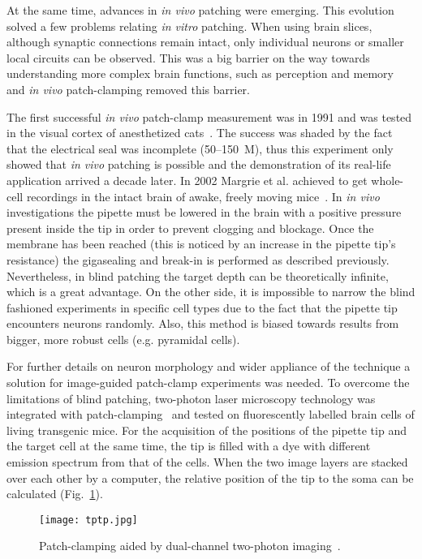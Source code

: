 \documentclass[12pt,a4paper]{report}
\begin{document}
At the same time, advances in \textit{in vivo} patching were emerging. This evolution solved a few problems relating \textit{in vitro} patching. When using brain slices, although synaptic connections remain intact, only individual neurons or smaller local circuits can be observed. This was a big barrier on the way towards understanding more complex brain functions, such as perception and memory and \textit{in vivo} patch-clamping removed this barrier.\par
The first successful \textit{in vivo} patch-clamp measurement was in 1991 and was tested in the visual cortex of anesthetized cats~\cite{pel1991}. The success was shaded by the fact that the electrical seal was incomplete (50--150~M\textOmega), thus this experiment only showed that \textit{in vivo} patching is possible and the demonstration of its real-life application arrived a decade later. In 2002 Margrie et al. achieved to get whole-cell recordings in the intact brain of awake, freely moving mice~\cite{margrie2002}. In \textit{in vivo} investigations the pipette must be lowered in the brain with a positive pressure present inside the tip in order to prevent clogging and blockage. Once the membrane has been reached (this is noticed by an increase in the pipette tip's resistance) the gigasealing and break-in is performed as described previously. Nevertheless, in blind patching the target depth can be theoretically infinite, which is a great advantage. On the other side, it is impossible to narrow the blind fashioned experiments in specific cell types due to the fact that the pipette tip encounters neurons randomly. Also, this method is biased towards results from bigger, more robust cells (e.g. pyramidal cells).\par
For further details on neuron morphology and wider appliance of the technique a solution for image-guided patch-clamp experiments was needed. To overcome the limitations of blind patching, two-photon laser microscopy technology was integrated with patch-clamping~\cite{margrie2003} and tested on fluorescently labelled brain cells of living transgenic mice. For the acquisition of the positions of the pipette tip and the target cell at the same time, the tip is filled with a dye with different emission spectrum from that of the cells. When the two image layers are stacked over each other by a computer, the relative position of the tip to the soma can be calculated (Fig.~\ref{fig:tptp}).
\begin{figure}
    \centering
    \texttt{[image: tptp.jpg]}
    \caption{Patch-clamping aided by dual-channel two-photon imaging~\cite{margrie2003}.}
    \label{fig:tptp}
\end{figure}
\end{document}
